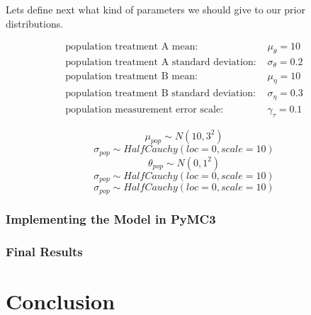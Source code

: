 \documentclass[12pt,a4paper,leqno]{report}
\theoremstyle{plain}
\theoremstyle{definition}
\theoremstyle{remark}
\begin{document}
Lets define next what kind of parameters we should give to our prior distributions.

\begin{align}\label{populationparameters}
    \text{population treatment A mean: } & \mu_{\theta} = 10 \\
    \text{population treatment A standard deviation: } & \sigma_{\theta} = 0.2 \nonumber \\
    \text{population treatment B mean: } & \mu_{\eta} = 10 \nonumber \\
    \text{population treatment B standard deviation: } & \sigma_{\eta} = 0.3 \nonumber \\
    \text{population measurement error scale: } & \gamma_{\tau} = 0.1 \nonumber
\end{align}

\begin{def}\label{population_priors}
    \begin{equation}\label{}
        \mu_{pop} \sim N(10, 3^2)
    \end{equation}
    \begin{equation}\label{}
        \sigma_{pop} \sim HalfCauchy(loc=0, scale=10)
    \end{equation}
    \begin{equation}\label{}
        \theta_{pop} \sim N(0, 1^2)
    \end{equation}
    \begin{equation}\label{}
        \sigma_{pop} \sim HalfCauchy(loc=0, scale=10)
    \end{equation}
    \begin{equation}\label{}
        \sigma_{pop} \sim HalfCauchy(loc=0, scale=10)
    \end{equation}
\end{def}

\subsection{Implementing the Model in PyMC3}

\subsection{Final Results}

\chapter{Conclusion}

\end{document}
